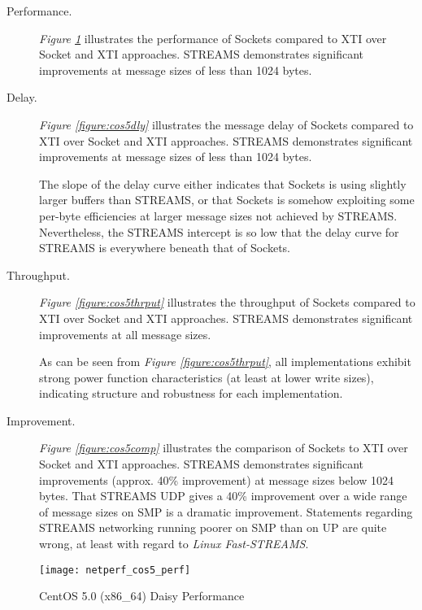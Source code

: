 \documentclass[letterpaper,final,notitlepage,twocolumn,10pt,twoside]{article}
\begin{document}
\begin{description}

\item[Performance.]

\textit{Figure \ref{figure:cos5perf}}
illustrates
the performance of Sockets compared to XTI over Socket and XTI approaches.
STREAMS demonstrates significant improvements at message sizes of less than
1024 bytes.

\item[Delay.]

\textit{Figure \ref{figure:cos5dly}}
illustrates
the message delay of Sockets compared to XTI over Socket and XTI approaches.
STREAMS demonstrates significant improvements at message sizes of less than
1024 bytes.

The slope of the delay curve either indicates that Sockets is using slightly
larger buffers than STREAMS, or that Sockets is somehow exploiting some
per-byte efficiencies at larger message sizes not achieved by STREAMS.
Nevertheless, the STREAMS intercept is so low that the delay curve for STREAMS
is everywhere beneath that of Sockets.

\item[Throughput.]

\textit{Figure \ref{figure:cos5thrput}}
illustrates the throughput of Sockets compared to XTI over Socket and XTI
approaches.  STREAMS demonstrates significant improvements at all message
sizes.

As can be seen from \textit{Figure \ref{figure:cos5thrput}}, all
implementations exhibit strong power function characteristics (at least at
lower write sizes), indicating structure and robustness for each
implementation.

\item[Improvement.]

\textit{Figure \ref{figure:cos5comp}}
illustrates
the comparison of Sockets to XTI over Socket and XTI approaches.  STREAMS
demonstrates significant improvements (approx. 40\% improvement) at message
sizes below 1024 bytes.  That STREAMS UDP gives a 40\% improvement over a wide
range of message sizes on SMP is a dramatic improvement.  Statements regarding
STREAMS networking running poorer on SMP than on UP are quite wrong, at least
with regard to \textsl{Linux Fast-STREAMS}.

\end{description}

\begin{figure}[p]
\center\texttt{[image: netperf\_cos5\_perf]}
\caption[CentOS 5.0 (x86\_64) Daisy Performance]{CentOS 5.0 (x86\_64) Daisy Performance}
\label{figure:cos5perf}
\end{figure}
\end{document}
